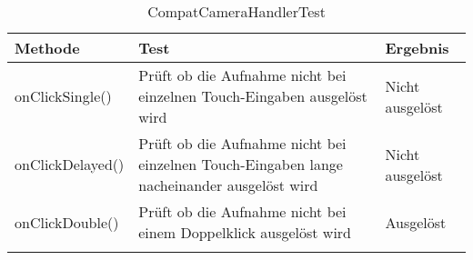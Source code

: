 \begin{longtable}{p{} | p{} | p{}}
\hline
  \textbf{Methode} & \textbf{Test} & \textbf{Ergebnis}\\
   \hline
   onClickSingle() & Prüft ob die Aufnahme nicht bei einzelnen Touch-Eingaben ausgelöst wird & Nicht ausgelöst \\
   \hline
   onClickDelayed() & Prüft ob die Aufnahme nicht bei einzelnen Touch-Eingaben lange nacheinander ausgelöst wird & Nicht ausgelöst \\
   \hline
   onClickDouble() & Prüft ob die Aufnahme nicht bei einem Doppelklick ausgelöst wird & Ausgelöst \\
   \hline
  \caption{CompatCameraHandlerTest}
\end{longtable}
                                                      
